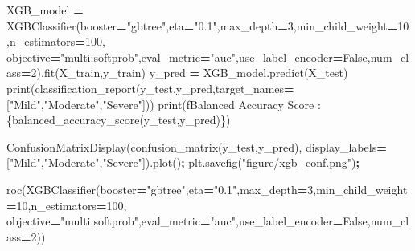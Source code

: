\documentclass[12pt,twoside]{deuthesis}
\newenvironment{Shaded}{\begin{snugshade}}{\end{snugshade}}
\newcommand{\BuiltInTok}[1]{#1}
\newcommand{\DecValTok}[1]{\textcolor[rgb]{0.00,0.00,0.81}{#1}}
\newcommand{\NormalTok}[1]{#1}
\newcommand{\OperatorTok}[1]{\textcolor[rgb]{0.81,0.36,0.00}{\textbf{#1}}}
\newcommand{\SpecialCharTok}[1]{\textcolor[rgb]{0.00,0.00,0.00}{#1}}
\newcommand{\SpecialStringTok}[1]{\textcolor[rgb]{0.31,0.60,0.02}{#1}}
\newcommand{\StringTok}[1]{\textcolor[rgb]{0.31,0.60,0.02}{#1}}
\newcommand{\VariableTok}[1]{\textcolor[rgb]{0.00,0.00,0.00}{#1}}
\begin{document}
\begin{Shaded}
\begin{Highlighting}[]
\NormalTok{XGB\_model }\OperatorTok{=}\NormalTok{ XGBClassifier(booster}\OperatorTok{=}\StringTok{"gbtree"}\NormalTok{,eta}\OperatorTok{=}\StringTok{"0.1"}\NormalTok{,max\_depth}\OperatorTok{=}\DecValTok{3}\NormalTok{,min\_child\_weight}\OperatorTok{=}\DecValTok{10}\NormalTok{,n\_estimators}\OperatorTok{=}\DecValTok{100}\NormalTok{,}
\NormalTok{objective}\OperatorTok{=}\StringTok{"multi:softprob"}\NormalTok{,eval\_metric}\OperatorTok{=}\StringTok{"auc"}\NormalTok{,use\_label\_encoder}\OperatorTok{=}\VariableTok{False}\NormalTok{,num\_class}\OperatorTok{=}\DecValTok{2}\NormalTok{).fit(X\_train,y\_train)}
\NormalTok{y\_pred }\OperatorTok{=}\NormalTok{ XGB\_model.predict(X\_test)}
\BuiltInTok{print}\NormalTok{(classification\_report(y\_test,y\_pred,target\_names}\OperatorTok{=}\NormalTok{[}\StringTok{"Mild"}\NormalTok{,}\StringTok{"Moderate"}\NormalTok{,}\StringTok{"Severe"}\NormalTok{]))}
\BuiltInTok{print}\NormalTok{(}\SpecialStringTok{f\textquotesingle{}Balanced Accuracy Score : }\SpecialCharTok{\{}\NormalTok{balanced\_accuracy\_score(y\_test,y\_pred)}\SpecialCharTok{\}}\SpecialStringTok{\textquotesingle{}}\NormalTok{)}
\end{Highlighting}
\end{Shaded}
\begin{Shaded}
\begin{Highlighting}[]
\NormalTok{ConfusionMatrixDisplay(confusion\_matrix(y\_test,y\_pred),}
\NormalTok{                       display\_labels}\OperatorTok{=}\NormalTok{[}\StringTok{"Mild"}\NormalTok{,}\StringTok{"Moderate"}\NormalTok{,}\StringTok{"Severe"}\NormalTok{]).plot()}\OperatorTok{;}
\NormalTok{plt.savefig(}\StringTok{"figure/xgb\_conf.png"}\NormalTok{)}\OperatorTok{;}
\end{Highlighting}
\end{Shaded}
\begin{Shaded}
\begin{Highlighting}[]
\NormalTok{roc(XGBClassifier(booster}\OperatorTok{=}\StringTok{"gbtree"}\NormalTok{,eta}\OperatorTok{=}\StringTok{"0.1"}\NormalTok{,max\_depth}\OperatorTok{=}\DecValTok{3}\NormalTok{,min\_child\_weight}\OperatorTok{=}\DecValTok{10}\NormalTok{,n\_estimators}\OperatorTok{=}\DecValTok{100}\NormalTok{,}
\NormalTok{objective}\OperatorTok{=}\StringTok{"multi:softprob"}\NormalTok{,eval\_metric}\OperatorTok{=}\StringTok{"auc"}\NormalTok{,use\_label\_encoder}\OperatorTok{=}\VariableTok{False}\NormalTok{,num\_class}\OperatorTok{=}\DecValTok{2}\NormalTok{))}
\end{Highlighting}
\end{Shaded}
\normalsize
\end{document}

